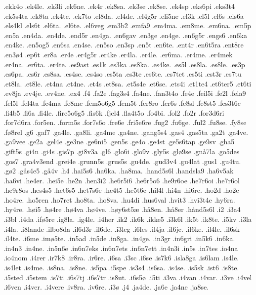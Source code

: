 .ekk4o
.ek4le.
.ek3li
.ek6ne.
.ek4r
.ek8sa.
.ek3se
.ek8se.
.ek4sp
.eks6pi
.eks3t4
.ek5s4ta
.ek8ta
.ek4te.
.ek7to
.el8da.
.el4de.
.el4g5r
.eli5ne
.el3k
.el5l
.el6s
.els6a
.els4kl
.els6t
.el6ta.
.el6te.
.el6veg
.em3b2
.emfa9
.em4ma.
.em8me.
.em6na.
.em5p
.en5a
.en4da.
.en4de.
.end5r
.en4ga.
.en6gav
.en3ge
.en4ge.
.en6g5r
.engs6
.en6ka
.en4ke.
.en5og5
.en6sa
.en4se.
.en5so
.en3sp
.en5t
.en6te.
.ent4r
.en6t5ra
.ent8re
.en3^^f84
.ep6t
.er8a
.er4e
.er4g5r
.er4ke
.er4la.
.er4le.
.er6ma.
.er4me.
.er4mek
.er4na.
.er6ta.
.er4te.
.es9ast
.es1k
.es3ka
.es8ka.
.es4ke.
.es5l
.es8la.
.es8le.
.es3p
.es6pa.
.es6r
.es8sa.
.es4se.
.es4so
.es5ta
.es3te
.es6te.
.es7tet
.es5ti
.est3r
.es7tu
.et8la.
.et8le.
.et4na
.et4ne.
.et4s
.et8sa.
.et5s4e
.et6se.
.ets4i
.et1te4
.et6ter5
.et6ti
.ev8ja
.ev4je.
.ev4ne.
.ex4
.f4
.fa2e
.fag3s4
.fa4ne.
.fan3t4o
.fe4e
.feil5i
.fe2l
.fela9
.fel5l
.fel4ta
.fe4ma
.fe8me
.fem5o6g5
.fem5t
.fer8ro
.fer6s
.fe8sl
.fe8st5
.fes3t6e
.fi4b5
.fi6a
.fi4le.
.fire5o6g5
.fis6k
.fjel4
.fla4t5o
.fo4bi.
.fol2
.fo2r
.for3d6ri
.for7d6ra
.for5en.
.form5s
.for7s6o
.fre6e
.fri5e6re
.fug2
.fu6ge.
.ful2
.fu8se.
.fy8se
.f^^f88rel
.g6
.gaf7
.ga4le.
.ga8li.
.ga4me
.ga4ne.
.gang5s4
.gas4
.gas5ta
.ga2t
.ga4ve.
.ga9vee
.ge2a
.gel4e
.ge3ne
.ge6ni5
.gen5s
.ge4o
.ge4st
.ge5s6tap
.ge9sv
.gha5
.gift5s
.gi4n
.gi4s
.gis7p
.gi8v3a
.gl6
.glo6i
.glo9v
.gly5s
.gl^^f89se
.gn^^e57la
.go5des
.gos7
.gra4v3end
.grei4e
.grunn5s
.grus5s
.gu4de.
.gud3v4
.gu4lat
.gus1
.gu4tu.
.g^^f82
.g^^e5s4e5
.g^^e54v
.h4
.hai5s6
.ha6ka.
.ha8ma.
.hand5s6l
.handsla9
.ha6v5ak
.ha6vi
.he4er.
.hei5e
.he2n
.hen3i2
.he6r5i6
.he6r5o6
.he9r6oe
.he7r6oi
.he7r6ol
.he9r8os
.hes4s5
.het6s5
.het7s6e
.he4t5
.he5t6e
.hil4l
.hi4n
.hi6re.
.ho2d
.ho2e
.ho4re.
.ho5ren
.ho7ret
.ho8ta.
.ho8va.
.hu4di
.hus6val
.hvit3
.hvi3t4e
.hy6ra.
.hy4re.
.h^^f8i5
.h^^f84re
.h^^f84va
.h^^f84ve.
.h^^f8y6st5^^e6
.h^^e58en.
.h^^e58er
.h^^e5nd5s6l
.i2
.i3a4
.i3bl
.i4da
.if^^f85re
.ig8la.
.ig4le.
.i4her
.ik2
.ik6k
.ikke5
.i3k6l
.ik5t
.ik8te.
.i5kv
.i3la
.i4la.
.i8lande
.ilbo8da
.il6d3r
.il6de.
.i3leg
.i6les
.il4ja
.il6je.
.il6ke.
.il4le.
.il6sk
.il4te.
.i6me
.im^^f85te.
.in5ad
.in5de
.in8ga.
.in4ge.
.in3gr
.in6gri
.in5k6
.in6ka.
.in4n3
.in4ne.
.in5n6e
.in6n7eks
.in6n7ets
.in6n7ett
.in4n3i
.in5s
.in7tes
.io4na
.io4nom
.i4rer
.ir7k8
.ir8ra.
.ir6re.
.i6sa
.i3sc
.i6se
.is7k6
.isla8ga
.is6lam
.is4le.
.is4let
.is4me.
.is8na.
.is8ne.
.is5pa
.i5spe
.is3s4
.is6sa.
.is4se.
.is5sk
.ist6
.is8te.
.i5sted
.i5stem
.is7ti
.i6s7tj
.i6s7tr
.is8ut.
.i6s5^^f8
.i5ti
.i3va
.i4van
.i4var.
.i3ve
.i4vel
.i6ven
.i4ver.
.i4vere
.iv8ra.
.iv6re.
.i3^^f8
.j4
.ja4de.
.ja6e
.ja4ne
.ja8se.
